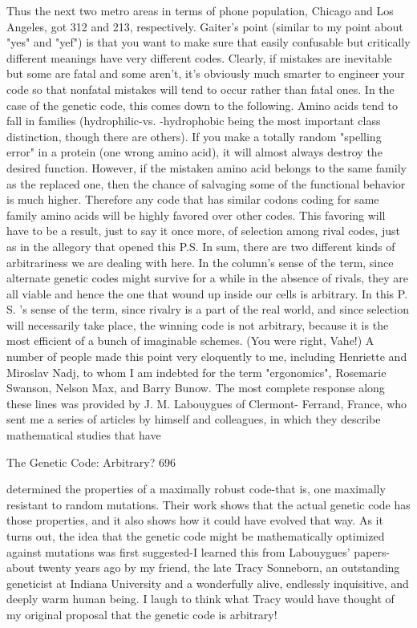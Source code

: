Thus the next two metro areas in terms of phone population, Chicago and Los
Angeles, got 312 and 213, respectively.
        Gaiter's point (similar to my point about "yes" and "yef") is that you want to
make sure that easily confusable but critically different meanings have very different
codes. Clearly, if mistakes are inevitable but some are fatal and some aren't, it's
obviously much smarter to engineer your code so that nonfatal mistakes will tend to
occur rather than fatal ones. In the case of the genetic code, this comes down to the
following. Amino acids tend to fall in families (hydrophilic-vs. -hydrophobic being
the most important class distinction, though there are others). If you make a totally
random "spelling error" in a protein (one wrong amino acid), it will almost always
destroy the desired function. However, if the mistaken amino acid belongs to the same
family as the replaced one, then the chance of salvaging some of the functional
behavior is much higher. Therefore any code that has similar codons coding for same
family amino acids will be highly favored over other codes. This favoring will have to
be a result, just to say it once more, of selection among rival codes, just as in the
allegory that opened this P.S.
        In sum, there are two different kinds of arbitrariness we are dealing with here.
In the column's sense of the term, since alternate genetic codes might survive for a
while in the absence of rivals, they are all viable and hence the one that wound up
inside our cells is arbitrary. In this P. S. 's sense of the term, since rivalry is a part of
the real world, and since selection will necessarily take place, the winning code is not
arbitrary, because it is the most efficient of a bunch of imaginable schemes. (You
were right, Vahe!) A number of people made this point very eloquently to me,
including Henriette and Miroslav Nadj, to whom I am indebted for the term
"ergonomics", Rosemarie Swanson, Nelson Max, and Barry Bunow. The most
complete response along these lines was provided by J. M. Labouygues of Clermont-
Ferrand, France, who sent me a series of articles by himself and colleagues, in which
they describe mathematical studies that have




The Genetic Code: Arbitrary?                                                            696

determined the properties of a maximally robust code-that is, one maximally resistant
to random mutations. Their work shows that the actual genetic code has those
properties, and it also shows how it could have evolved that way.
       As it turns out, the idea that the genetic code might be mathematically
optimized against mutations was first suggested-I learned this from Labouygues'
papers-about twenty years ago by my friend, the late Tracy Sonneborn, an outstanding
geneticist at Indiana University and a wonderfully alive, endlessly inquisitive, and
deeply warm human being. I laugh to think what Tracy would have thought of my
original proposal that the genetic code is arbitrary!

